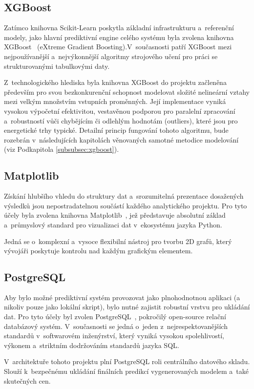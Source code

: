 \documentclass[a4paper]{article}
\begin{document}
\subsection{XGBoost}
Zatímco knihovna Scikit-Learn poskytla základní infrastrukturu a~referenční modely, jako hlavní prediktivní engine celého systému byla zvolena knihovna XGBoost~\cite{xgboost} (eXtreme Gradient Boosting).V~současnosti patří XGBoost mezi nejpoužívanější a~nejvýkonnější algoritmy strojového učení pro práci se strukturovanými tabulkovými daty.

Z~technologického hlediska byla knihovna XGBoost do projektu začleněna především pro svou bezkonkurenční schopnost modelovat složité nelineární vztahy mezi velkým množstvím vstupních proměnných. Její implementace vyniká vysokou výpočetní efektivitou, vestavěnou podporou pro paralelní zpracování a~robustností vůči chybějícím či odlehlým hodnotám (outliers), které jsou pro energetické trhy typické. Detailní princip fungování tohoto algoritmu, bude rozebrán v~následujících kapitolách věnovaných samotné metodice modelování (viz Podkapitola \ref{subsubsec:xgboost}).

\subsection{Matplotlib}
Získání hlubšího vhledu do struktury dat a~srozumitelná prezentace dosažených výsledků jsou nepostradatelnou součástí každého analytického projektu. Pro tyto účely byla zvolena knihovna Matplotlib~\cite{matplotlib}, jež představuje absolutní základ a~průmyslový standard pro vizualizaci dat v~ekosystému jazyka Python.

Jedná se o~komplexní a~vysoce flexibilní nástroj pro tvorbu 2D grafů, který vývojáři poskytuje kontrolu nad každým grafickým elementem. 

\subsection{PostgreSQL}
Aby bylo možné prediktivní systém provozovat jako plnohodnotnou aplikaci (a nikoliv pouze jako lokální skript), bylo nutné zajistit robustní vrstvu pro ukládání dat. Pro tyto účely byl zvolen PostgreSQL~\cite{postgres}, pokročilý open-source relační databázový systém. V~současnosti se jedná o~jeden z~nejrespektovanějších standardů v~softwarovém inženýrství, který vyniká vysokou spolehlivostí, výkonem a~striktním dodržováním standardů jazyka SQL.

V~architektuře tohoto projektu plní PostgreSQL roli centrálního datového skladu. Slouží k~bezpečnému ukládání finálních predikcí vygenerovaných modelem a~také skutečných cen.
\end{document}
